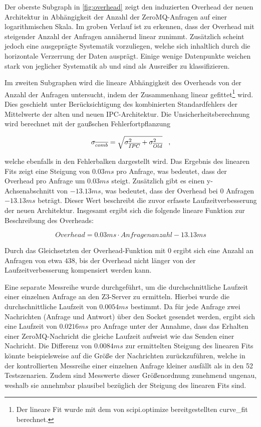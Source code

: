 Der oberste Subgraph in \cref{fig:overhead} zeigt den induzierten Overhead der neuen Architektur in Abhängigkeit der Anzahl der ZeroMQ-Anfragen auf einer logarithmischen Skala.
Im groben Verlauf ist zu erkennen, dass der Overhead mit steigender Anzahl der Anfragen annähernd linear zunimmt.
Zusätzlich scheint jedoch eine ausgeprägte Systematik vorzuliegen, welche sich inhaltlich durch die horizontale Verzerrung der Daten ausprägt.
Einige wenige Datenpunkte weichen stark von jeglicher Systematik ab und sind als Ausreißer zu klassifizieren.

Im zweiten Subgraphen wird die lineare Abhängigkeit des Overheads von der Anzahl der Anfragen untersucht, indem der Zusammenhang linear gefittet\footnote{Der lineare Fit wurde mit dem von scipi.optimize bereitgestellten curve\_fit berechnet.} wird.
Dies geschieht unter Berücksichtigung des kombinierten Standardfehlers der Mittelwerte der alten und neuen IPC-Architektur.
Die Unsicherheitsberechnung wird berechnet mit der gaußschen Fehlerfortpflanzung

\begin{equation}
    \sigma_{\overline{comb}} = \sqrt{\sigma_{\overline{IPC}}^2 + \sigma_{\overline{Old}}^2} \hspace{0.3cm},
\end{equation}

welche ebenfalls in den Fehlerbalken dargestellt wird.
Das Ergebnis des linearen Fits zeigt eine Steigung von $0.03 ms$ pro Anfrage, was bedeutet, dass der Overhead pro Anfrage um $0.03 ms$ steigt.
Zusätzlich gibt es einen y-Achsenabschnitt von $-13.13 ms$, was bedeutet, dass der Overhead bei $0$ Anfragen $-13.13 ms$ beträgt.
Dieser Wert beschreibt die zuvor erfasste Laufzeitverbesserung der neuen Architektur.
Insgesamt ergibt sich die folgende lineare Funktion zur Beschreibung des Overheads:

\begin{equation}
    Overhead = 0.03ms \cdot Anfragenanzahl - 13.13ms
\end{equation}

Durch das Gleichsetzten der Overhead-Funktion mit $0$ ergibt sich eine Anzahl an Anfragen von etwa $438$, bis der Overhead nicht länger von der Laufzeitverbesserung kompensiert werden kann.

Eine separate Messreihe wurde durchgeführt, um die durchschnittliche Laufzeit einer einzelnen Anfrage an den Z3-Server zu ermitteln.
Hierbei wurde die durchschnittliche Laufzeit von $0.0054 ms$ bestimmt.
Da für jede Anfrage zwei Nachrichten (Anfrage und Antwort) über den Socket gesendet werden, ergibt sich eine Laufzeit von $0.0216 ms$ pro Anfrage
unter der Annahme, dass das Erhalten einer ZeroMQ-Nachricht die gleiche Laufzeit aufweist wie das Senden einer Nachricht.
Die Differenz von $0.0084 ms$ zur ermittelten Steigung des linearen Fits könnte beispielsweise auf die Größe der Nachrichten zurückzuführen, welche
in der kontrollierten Messreihe einer einzelnen Anfrage kleiner ausfällt als in den 52 Testszenarien.
Zudem sind Messwerte dieser Größenordnung zunehmend ungenau, weshalb sie annehmbar plausibel bezüglich der Steigung des linearen Fits sind.


